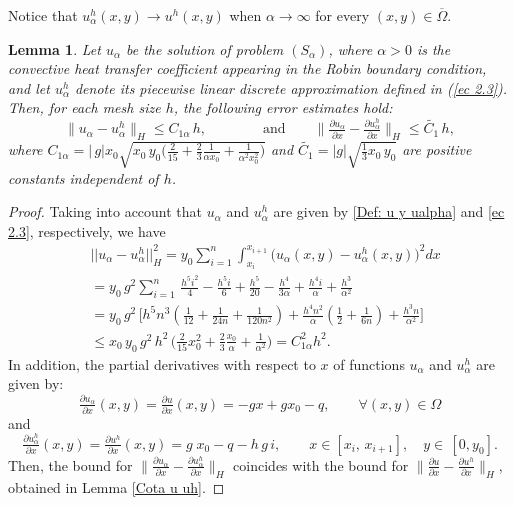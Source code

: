 \documentclass[11pt]{article}
\newcommand{\dee}{d}
\newcommand{\bint}{\displaystyle\int}
\newcommand\pder[2][]{\ensuremath{\tfrac{\partial#1}{\partial#2}}}
\newtheorem{Lemma}{Lemma}
\begin{document}
Notice that  ${u^h_{\alpha}(x,y)}\to u^h(x,y)$ when $\alpha\to \infty$  for every $(x,y)\in \overline{\Omega}$.



\begin{Lemma}\label{lema convergencia uhalpha a ualpha}
{Let} $u_{\alpha}$ {be}  the solution of {problem }$(S_\alpha)$, {where $\alpha>0$ is the convective heat transfer coefficient appearing in the Robin boundary condition, and let $u^h_{\alpha}$ denote its piecewise linear discrete approximation defined} in (\ref{ec 2.3}). {Then, for each mesh size}  $h$, {the following error estimates hold}:
     		\[\lVert u_\alpha-{u^h_{\alpha}}  \rVert _H \leq C_{1\alpha}\,h,\qquad \qquad \text{and}\qquad
\lVert \tfrac{\partial u_{\alpha }}{\partial x}-\tfrac{\partial {u^h_{\alpha}}}{\partial x} \rVert _H \leq \widetilde{C_{1}}\, h, \]
     		{where } $C_{1\alpha}= \lvert\,g\rvert x_0\sqrt{ x_0\,y_0 \Big( \frac{2}{15} +\frac{2}{3}\frac{1}{\alpha x_0} + \tfrac{1}{\alpha^2 x_0^2} \Big)  }$ and $\widetilde{C_{1}}= |g|\sqrt{\tfrac{1}{3}x_0 \, y_0} $ {are positive constants independent of $h$. }
     	
\end{Lemma}

\begin{proof}
{Taking into account that $u_\alpha$ and {$u^h_{\alpha}$} are given by \eqref{Def: u y ualpha} and \eqref{ec 2.3}, respectively}, we have
 $$\begin{array}{ll}
&     ||u_\alpha-{u^h_{\alpha}}||_{H}^2 =y_0 \displaystyle\sum\limits_{i=1}^n \bint_{x_i}^{x_{i+1}}  \big(u_\alpha(x,y)-{u^h_{\alpha}}(x,y)\big)^2  \dee x\\ 
    &=y_0 \, g^2 \displaystyle\sum\limits_{i=1}^n  \, \frac{h^5 i^2}{4}-\frac{h^5 i}{6}+\frac{h^5}{20}-\frac{h^4}{3 \alpha }+\frac{h^4 i}{\alpha }+\frac{h^3}{\alpha ^2}\\ 
   &= y_0\, g^2\, \Big[ h^5 n^3 \left( \frac{1}{12}+\frac{1}{24n}+\frac{1}{120n^2}\right) +\frac{h^4 n^2}{\alpha}\left( \frac{1}{2}+\frac{1}{6n}\right)+\frac{h^3n}{\alpha^2} \Big]\\
 &  \leq x_0\,  y_0\, g^2\,h^2 \, \Big( \frac{2}{15}x_0^2+\frac{2}{3} \frac{x_0}{\alpha}+\frac{1}{\alpha^2} \Big)=C_{1\alpha}^2 h^2.
     \end{array}$$
In addition, the {partial derivatives with respect to $x$} of functions $u_\alpha$ and {$u^h_{\alpha}$} are given by:
$$\pder[u_{\alpha}]{x}(x,y)=\pder[u]{x}(x,y)=-gx+gx_0-q,\qquad \forall (x,y)\in \Omega$$ 
   and
    $$\pder[{u^h_{\alpha}}]{x}(x,y)=\pder[{u^{h}}]{x}(x,y)=  g\; x_0-q-h\,g\,i, \qquad x\in [x_i,\, x_{i+1}],\quad y\in\,[0,y_0].$$
Then, the bound for $\lVert \pder[u_{\alpha}]{x}-\pder[{u^h_{\alpha}}]{x} \rVert _H$  coincides with the bound for $\lVert \pder[u]{x}-\pder[{u^h}]{x} \rVert _H$,  obtained in Lemma \ref{Cota u uh}.
\end{proof}     
\end{document}
